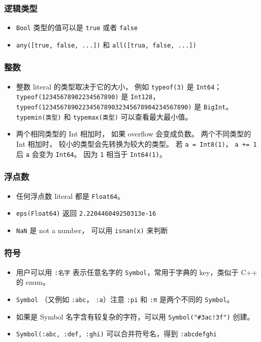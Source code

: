 \subsubsection{逻辑类型}
\begin{itemize}
\item \verb`Bool` 类型的值可以是 \verb`true` 或者 \verb`false`
\item \verb`any([true, false, ...])` 和 \verb`all([trua, false, ...])`
\end{itemize}

\subsubsection{整数}
\begin{itemize}
\item 整数 literal 的类型取决于它的大小， 例如 \verb`typeof(3)` 是 \verb`Int64`； \verb`typeof(12345678902234567890)` 是 \verb`Int128`， \verb`typeof(1234567890223456789032345678904234567890)` 是 \verb`BigInt`。 \verb`typemin(类型)` 和 \verb`typemax(类型)` 可以查看最大最小值。
\item 两个相同类型的 Int 相加时， 如果 overflow 会变成负数。 两个不同类型的 Int 相加时， 较小的类型会先转换为较大的类型。 若 \verb`a = Int8(1)`， \verb`a += 1` 后 \verb`a` 会变为 \verb`Int64`。 因为 \verb`1` 相当于 \verb`Int64(1)`。
\end{itemize}

\subsubsection{浮点数}
\begin{itemize}
\item 任何浮点数 literal 都是 \verb`Float64`。
\item \verb`eps(Float64)` 返回 \verb`2.220446049250313e-16`
\item \verb`NaN` 是 not a number， 可以用 \verb`isnan(x)` 来判断
\end{itemize}

\subsubsection{符号}
\begin{itemize}
\item 用户可以用 \verb`:名字` 表示任意名字的 \verb`Symbol`，常用于字典的 key，类似于 C++ 的 enum。
\item \verb`Symbol` （又例如 \verb`:abc`， \verb`:a`）注意 \verb`:pi` 和 \verb`:π` 是两个不同的 \verb`Symbol`。
\item 如果是 Symbol 名字含有较复杂的字符，可以用 \verb`Symbol("#3ac!3f")` 创建。
\item \verb`Symbol(:abc, :def, :ghi)` 可以合并符号名，得到 \verb`:abcdefghi`
\end{itemize}


